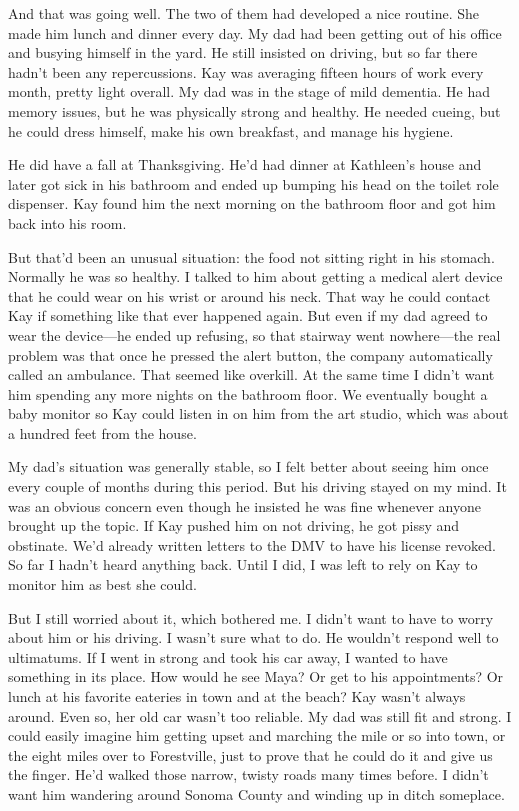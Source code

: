 \documentclass[12pt]{book}
\begin{document}
And that was going well. The two of them had developed a nice routine. She made him lunch and dinner every day. My dad had been getting out of his office and busying himself in the yard. He still insisted on driving, but so far there hadn't been any repercussions. Kay was averaging fifteen hours of work every month, pretty light overall. My dad was in the stage of mild dementia. He had memory issues, but he was physically strong and healthy. He needed cueing, but he could dress himself, make his own breakfast, and manage his hygiene.

He did have a fall at Thanksgiving. He'd had dinner at Kathleen's house and later got sick in his bathroom and ended up bumping his head on the toilet role dispenser. Kay found him the next morning on the bathroom floor and got him back into his room.

But that'd been an unusual situation: the food not sitting right in his stomach. Normally he was so healthy. I talked to him about getting a medical alert device that he could wear on his wrist or around his neck. That way he could contact Kay if something like that ever happened again. But even if my dad agreed to wear the device---he ended up refusing, so that stairway went nowhere---the real problem was that once he pressed the alert button, the company automatically called an ambulance. That seemed like overkill. At the same time I didn't want him spending any more nights on the bathroom floor. We eventually bought a baby monitor so Kay could listen in on him from the art studio, which was about a hundred feet from the house.

My dad's situation was generally stable, so I felt better about seeing him once every couple of months during this period. But his driving stayed on my mind. It was an obvious concern even though he insisted he was fine whenever anyone brought up the topic. If Kay pushed him on not driving, he got pissy and obstinate. We'd already written letters to the DMV to have his license revoked. So far I hadn't heard anything back. Until I did, I was left to rely on Kay to monitor him as best she could.

But I still worried about it, which bothered me. I didn't want to have to worry about him or his driving. I wasn't sure what to do. He wouldn't respond well to ultimatums. If I went in strong and took his car away, I wanted to have something in its place. How would he see Maya? Or get to his appointments? Or lunch at his favorite eateries in town and at the beach? Kay wasn't always around. Even so, her old car wasn't too reliable. My dad was still fit and strong. I could easily imagine him getting upset and marching the mile or so into town, or the eight miles over to Forestville, just to prove that he could do it and give us the finger. He'd walked those narrow, twisty roads many times before. I didn't want him wandering around Sonoma County and winding up in ditch someplace.
\end{document}
